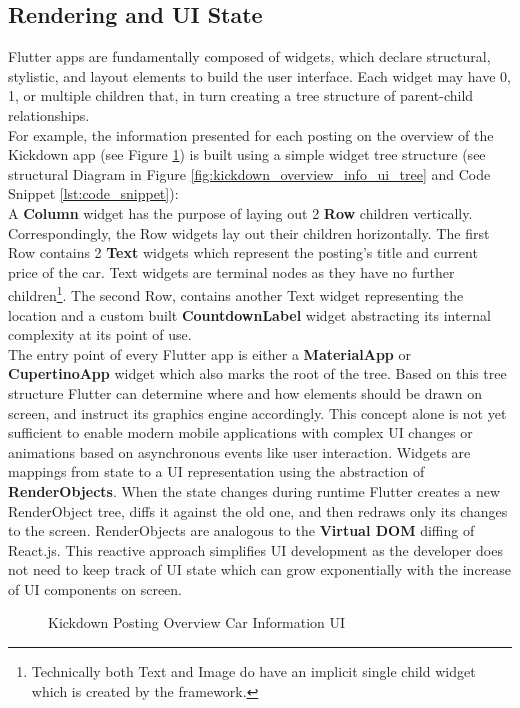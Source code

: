 \subsection{Rendering and UI State} \label{subsection::rendering_ui_state}
Flutter apps are fundamentally composed of widgets, which declare structural, stylistic, and layout elements to build the user interface. 
Each widget may have 0, 1, or multiple children that, in turn creating a tree structure of parent-child relationships.\\
For example, the information presented for each posting on the overview of the Kickdown app (see Figure \ref{fig:kickdown_overview_info_ui}) is built using a simple widget tree structure (see structural Diagram in Figure \ref{fig:kickdown_overview_info_ui_tree} and Code Snippet \ref{lst:code_snippet}):\\
A \textbf{Column} widget has the purpose of laying out 2 \textbf{Row} children vertically. Correspondingly, the Row widgets lay out their children horizontally. 
The first Row contains 2 \textbf{Text} widgets which represent the posting's title and current price of the car. 
Text widgets are terminal nodes as they have no further children\footnote{Technically both Text and Image do have an implicit single child widget which is created by the framework.}.
The second Row, contains another Text widget representing the location and a custom built \textbf{CountdownLabel} widget abstracting its internal complexity at its point of use.\\
The entry point of every Flutter app is either a \textbf{MaterialApp} or \textbf{CupertinoApp} widget which also marks the root of the tree.
Based on this tree structure Flutter can determine where and how elements should be drawn on screen, and instruct its graphics engine accordingly.
This concept alone is not yet sufficient to enable modern mobile applications with complex UI changes or animations 
based on asynchronous events like user interaction. 
Widgets are mappings from state to a UI representation using the abstraction of \textbf{RenderObjects}. When the state changes during runtime Flutter creates a new RenderObject tree, 
diffs it against the old one, and then redraws only its changes to the screen.
RenderObjects are analogous to the \textbf{Virtual DOM} diffing of React.js.
This reactive approach simplifies UI development as the developer does not need to keep track of UI state which can grow exponentially
with the increase of UI components on screen. 

\begin{figure}
    \centering
    \caption{Kickdown Posting Overview Car Information UI}
    \label{fig:kickdown_overview_info_ui}
\end{figure}

